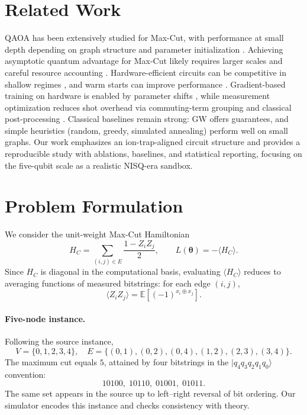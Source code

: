 \section{Related Work}
QAOA has been extensively studied for Max-Cut, with performance at small depth depending on graph structure and parameter initialization \cite{farhi2014qaoa,hadfield2019qaoaops,shaydulin2020qaoa}. Achieving asymptotic quantum advantage for Max-Cut likely requires larger scales and careful resource accounting \cite{guerreschi2019qaoacost}. Hardware-efficient circuits can be competitive in shallow regimes \cite{kandala2017hardware}, and warm starts can improve performance \cite{egger2021warmstart}. Gradient-based training on hardware is enabled by parameter shifts \cite{schuld2019gradients,mitarai2018quantum}, while measurement optimization reduces shot overhead via commuting-term grouping and classical post-processing \cite{huggins2021efficient,verteletskyi2020measurement}. Classical baselines remain strong: GW \cite{goemans1995maxcut} offers guarantees, and simple heuristics (random, greedy, simulated annealing) perform well on small graphs. Our work emphasizes an ion-trap-aligned circuit structure and provides a reproducible study with ablations, baselines, and statistical reporting, focusing on the five-qubit scale as a realistic NISQ-era sandbox.

\section{Problem Formulation}
We consider the unit-weight Max-Cut Hamiltonian
\begin{equation}
    H_C = \sum_{(i,j)\in E} \frac{1 - Z_i Z_j}{2}, \qquad L(\boldsymbol{\theta}) = -\langle H_C \rangle.
\end{equation}
Since $H_C$ is diagonal in the computational basis, evaluating $\langle H_C\rangle$ reduces to averaging functions of measured bitstrings: for each edge $(i,j)$,
\begin{equation}
    \langle Z_i Z_j\rangle = \mathbb{E}[(-1)^{x_i\oplus x_j}].
\end{equation}

\paragraph{Five-node instance.}
Following the source instance,
\begin{equation}
    V=\{0,1,2,3,4\}, \quad E=\{(0,1),(0,2),(0,4),(1,2),(2,3),(3,4)\}.
\end{equation}
The maximum cut equals $5$, attained by four bitstrings in the $|q_4 q_3 q_2 q_1 q_0\rangle$ convention:
\begin{equation*}
    10100,\; 10110,\; 01001,\; 01011.
\end{equation*}
The same set appears in the source up to left–right reversal of bit ordering. Our simulator encodes this instance and checks consistency with theory.

